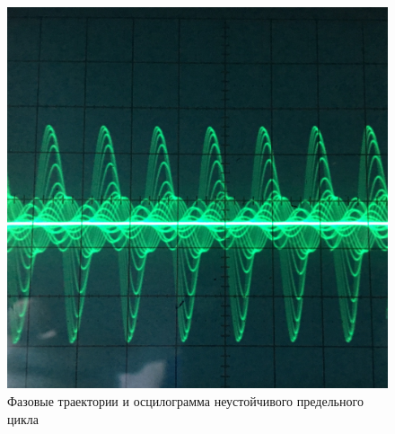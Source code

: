 \begin{figure}[h]
\begin{minipage}{0.32\linewidth}
	\includegraphics[width=\linewidth]{photo/task2b1(oscill).jpg}
	\end{minipage}
	\caption{Фазовые траектории и осцилограмма неустойчивого предельного цикла}
	\label{fig8}
\end{figure}
